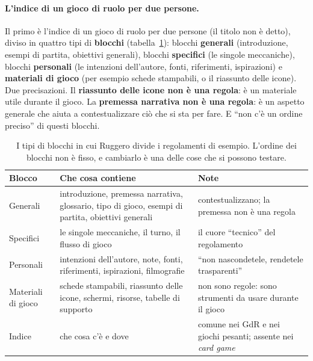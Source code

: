 \paragraph{L'indice di un gioco di ruolo per due persone.} Il primo è l'indice di un
gioco di ruolo per due persone (il titolo non è detto), diviso in quattro tipi di
\textbf{blocchi} (tabella~\ref{a12:tab:blocchi}): blocchi \textbf{generali}
(introduzione, esempi di partita, obiettivi generali), blocchi \textbf{specifici} (le
singole meccaniche), blocchi \textbf{personali} (le intenzioni dell'autore, fonti,
riferimenti, ispirazioni) e \textbf{materiali di gioco} (per esempio schede stampabili,
o il riassunto delle icone). Due precisazioni. Il \textbf{riassunto delle icone non è una
regola}: è un materiale utile durante il gioco. La \textbf{premessa narrativa non è una
regola}: è un aspetto generale che aiuta a contestualizzare ciò che si sta per fare. E
``non c'è un ordine preciso'' di questi blocchi.

\begin{table}[htbp]
\centering
\small
\begin{tabular}{@{}p{2.6cm}p{5.4cm}p{5.0cm}@{}}
\toprule
\textbf{Blocco} & \textbf{Che cosa contiene} & \textbf{Note} \\
\midrule
Generali & introduzione, premessa narrativa, glossario, tipo di gioco, esempi di
partita, obiettivi generali & contestualizzano; la premessa non è una regola \\
Specifici & le singole meccaniche, il turno, il flusso di gioco & il cuore
``tecnico'' del regolamento \\
Personali & intenzioni dell'autore, note, fonti, riferimenti, ispirazioni, filmografie
& ``non nascondetele, rendetele trasparenti'' \\
Materiali di gioco & schede stampabili, riassunto delle icone, schermi, risorse,
tabelle di supporto & non sono regole: sono strumenti da usare durante il gioco \\
Indice & che cosa c'è e dove & comune nei GdR e nei giochi pesanti; assente nei
\emph{card game} \\
\bottomrule
\end{tabular}
\caption{I tipi di blocchi in cui Ruggero divide i regolamenti di esempio. L'ordine dei
blocchi non è fisso, e cambiarlo è una delle cose che si possono testare.}
\label{a12:tab:blocchi}
\end{table}

